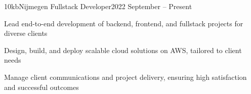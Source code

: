 \resumeSubheading
  {10kb}{Nijmegen}
  {Fullstack Developer}{2022 September – Present}
  \vspace{\experienceItemSpacing}
  \resumeItemListStart
\item Lead end-to-end development of backend, frontend, and fullstack projects for diverse clients
\item Design, build, and deploy scalable cloud solutions on AWS, tailored to client needs
\item Manage client communications and project delivery, ensuring high satisfaction and successful outcomes
  \resumeItemListEnd 